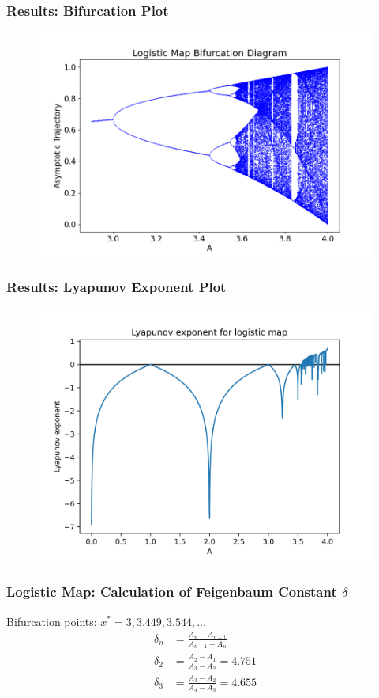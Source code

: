 \documentclass[
	11pt, %
	aspectratio=169, %
]{beamer}
\begin{document}
\begin{frame}
        \frametitle{Results: Bifurcation Plot}
    \begin{figure}
        \includegraphics[width=0.6\linewidth]{logistic_bifurcation_diagram.png}
    \end{figure}
\end{frame}


\begin{frame}
        \frametitle{Results: Lyapunov Exponent Plot}
    \begin{figure}
        \includegraphics[width=0.6\linewidth]{logistic_lyapunov_exp.png}
    \end{figure}
\end{frame}


\begin{frame}
        \frametitle{Logistic Map: Calculation of Feigenbaum Constant $\delta$}
        Bifurcation points: $x^* = 3, 3.449, 3.544, \dots$ \pause
        \begin{align*}
            \delta_{n} &= \frac{A_{n}-A_{n-1}}{A_{n+1}-A_{n}} \\
            \delta_{2} &= \frac{A_{2}-A_{1}}{A_{3}-A_{2}} = 4.751 \\
            \delta_{3} &= \frac{A_{3}-A_{2}}{A_{4}-A_{3}} = 4.655
        \end{align*}
\end{frame}
\end{document}
